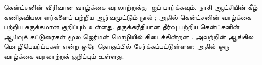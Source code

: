\documentclass[../../../include/open-logic-section]{subfiles}
\begin{document}
\begin{reading}
கென்ட்சனின் விரிவான வாழ்க்கை வரலாற்றுக்கு \citet{Menzler-Trott2007}-ஐப்
பார்க்கவும். நாசி ஆட்சியின் கீழ் கணிதவியலாளர்களைப் பற்றிய ஆர்வமூட்டும்
நூல் \citet{Segal2014}; அதில் கென்ட்சனின் வாழ்க்கை பற்றிய சுருக்கமான
குறிப்பும் உள்ளது. தருக்கரீதியான தீர்வு பற்றிய கென்ட்சனின் ஆய்வுக்
கட்டுரைகள் மூல ஜெர்மன் மொழியில் கிடைக்கின்றன
\citep{Gentzen1935a,Gentzen1935b}. அவற்றின் ஆங்கில மொழிபெயர்ப்புகள்
\citet{Gentzen1969} என்ற ஒரே தொகுப்பில் சேர்க்கப்பட்டுள்ளன; அதில் ஒரு
வாழ்க்கை வரலாற்றுக் குறிப்பும் உள்ளது.
\end{reading}
\end{document}
